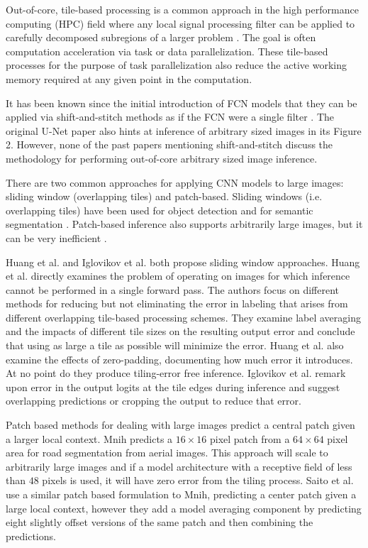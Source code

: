 \documentclass[10pt, indentfirst]{article}
\begin{document}
Out-of-core, tile-based processing is a common approach in the high performance computing (HPC) field where any local signal processing filter can be applied to carefully decomposed subregions of a larger problem \citep{Blattner2017}. The goal is often computation acceleration via task or data parallelization. These tile-based processes for the purpose of task parallelization also reduce the active working memory required at any given point in the computation.

It has been known since the initial introduction of FCN models that they can be applied via shift-and-stitch methods as if the FCN were a single filter \citep{Long2015,Sherrah2016}.
The original U-Net paper \citep{Ronneberger2015a} also hints at inference of arbitrary sized images in its Figure 2. However, none of the past papers mentioning shift-and-stitch discuss the methodology for performing out-of-core arbitrary sized image inference.

There are two common approaches for applying CNN models to large images: sliding window (overlapping tiles) and patch-based. Sliding windows (i.e. overlapping tiles) have been used for object detection \citep{Sermanet2013,VanEtten2019} and for semantic segmentation \citep{Lin2019,Volpi2017a}. Patch-based inference also supports arbitrarily large images, but it can be very inefficient \citep{Volpi2017a,Maggiori2016}.

Huang et al. and Iglovikov et al. \citep{Huang2019a,Iglovikov2017} both propose sliding window approaches. Huang et al. \citep{Huang2019a} directly examines the problem of operating on images for which inference cannot be performed in a single forward pass. The authors focus on different methods for reducing but not eliminating the error in labeling that arises from different overlapping tile-based processing schemes. They examine label averaging and the impacts of different tile sizes on the resulting output error and conclude that using as large a tile as possible will minimize the error. Huang et al. \citep{Huang2019a} also examine the effects of zero-padding, documenting how much error it introduces. At no point do they produce tiling-error free inference. Iglovikov et al. \citep{Iglovikov2017} remark upon error in the output logits at the tile edges during inference and suggest overlapping predictions or cropping the output to reduce that error. 

Patch based methods for dealing with large images predict a central patch given a larger local context. Mnih \citep{Mnih2013} predicts a $16 \times 16$ pixel patch from a $64 \times 64$ pixel area for road segmentation from aerial images. This approach will scale to arbitrarily large images and if a model architecture with a receptive field of less than $48$ pixels is used, it will have zero error from the tiling process. Saito et al. \citep{Saito2016} use a similar patch based formulation to Mnih, predicting a center patch given a large local context, however they add a model averaging component by predicting eight slightly offset versions of the same patch and then combining the predictions.
\end{document}
